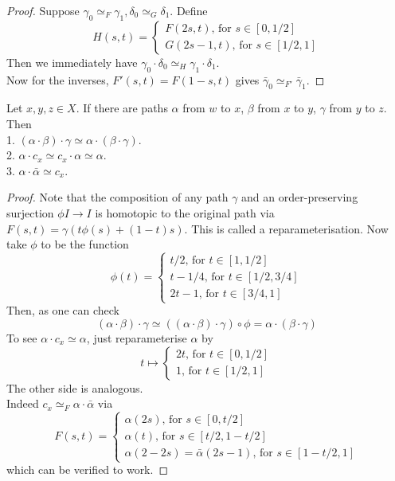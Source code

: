\begin{proof}
    Suppose $\gamma_0\simeq_F\gamma_1,\delta_0\simeq_G\delta_1$.
    Define
    $$H(s,t)=\begin{cases}
        F(2s,t)\text{, for $s\in[0,1/2]$}\\
        G(2s-1,t)\text{, for $s\in[1/2,1]$}
    \end{cases}$$
    Then we immediately have $\gamma_0\cdot\delta_0\simeq_H\gamma_1\cdot\delta_1$.\\
    Now for the inverses, $F'(s,t)=F(1-s,t)$ gives $\bar\gamma_0\simeq_{F'}\bar\gamma_1$.
\end{proof}
\begin{lemma}\label{fund_group_ax}
    Let $x,y,z\in X$.
    If there are paths $\alpha$ from $w$ to $x$, $\beta$ from $x$ to $y$, $\gamma$ from $y$ to $z$.
    Then\\
    1. $(\alpha\cdot\beta)\cdot\gamma\simeq\alpha\cdot(\beta\cdot\gamma)$.\\
    2. $\alpha\cdot c_x\simeq c_x\cdot\alpha\simeq\alpha$.\\
    3. $\alpha\cdot\bar\alpha\simeq c_x$.
\end{lemma}
\begin{proof}
    Note that the composition of any path $\gamma$ and an order-preserving surjection $\phi I\to I$ is homotopic to the original path via $F(s,t)=\gamma(t\phi(s)+(1-t)s)$.
    This is called a reparameterisation.
    Now take $\phi$ to be the function
    $$\phi(t)=\begin{cases}
        t/2\text{, for $t\in[1,1/2]$}\\
        t-1/4\text{, for $t\in[1/2,3/4]$}\\
        2t-1\text{, for $t\in[3/4,1]$}
    \end{cases}$$
    Then, as one can check
    $$(\alpha\cdot\beta)\cdot\gamma\simeq((\alpha\cdot\beta)\cdot\gamma)\circ\phi=\alpha\cdot(\beta\cdot\gamma)$$
    To see $\alpha\cdot c_x\simeq\alpha$, just reparameterise $\alpha$ by
    $$t\mapsto\begin{cases}
        2t\text{, for $t\in [0,1/2]$}\\
        1\text{, for $t\in[1/2,1]$}
    \end{cases}$$
    The other side is analogous.\\
    Indeed $c_x\simeq_F\alpha\cdot\bar\alpha$ via
    $$F(s,t)=\begin{cases}
        \alpha(2s)\text{, for $s\in[0,t/2]$}\\
        \alpha(t)\text{, for $s\in[t/2,1-t/2]$}\\
        \alpha(2-2s)=\bar\alpha(2s-1)\text{, for $s\in[1-t/2,1]$}
    \end{cases}$$
    which can be verified to work.
\end{proof}

